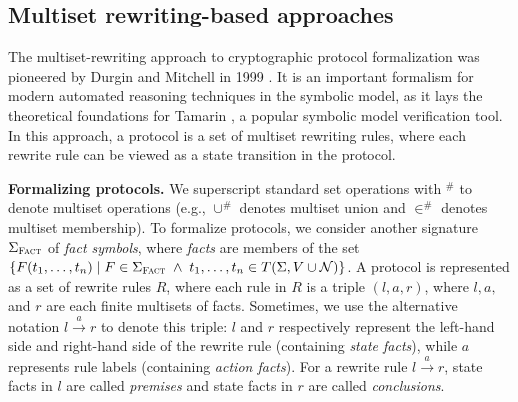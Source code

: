 \documentclass{article}
\theoremstyle{definition}
\begin{document}
\subsection{Multiset rewriting-based approaches}\label{sec:msr-approaches}
The multiset-rewriting approach to cryptographic protocol formalization was pioneered by Durgin and Mitchell in 1999 \cite{msr_foundations}. It is an important formalism for modern automated reasoning techniques in the symbolic model, as it lays the theoretical foundations for Tamarin \cite{tamarin}, a popular symbolic model verification tool.
In this approach, a protocol is a set of multiset rewriting rules, where each rewrite rule can be viewed as a state transition in the protocol. 

\textbf{Formalizing protocols.} We superscript standard set operations with $^\#$ to denote multiset operations (e.g., $\cup^\#$ denotes multiset union and $\in^\#$ denotes multiset membership). To formalize protocols, we consider another signature $\Sigma_{\textsc{Fact}}$ of \textit{fact symbols}, where \textit{facts} are members of the set $\{ F(t_1, \dots, t_n) \mid F \in \Sigma_{\textsc{Fact}} \;\land\; t_1, \dots, t_n \in T(\Sigma, V \cup \mathcal{N}) \}$. A protocol is represented as a set of rewrite rules $R$, where each rule in $R$ is a triple $(l, a, r)$, where $l, a,$ and $r$ are each finite multisets of facts. Sometimes, we use the alternative notation $l \xrightarrow{a} r$ to denote this triple: $l$ and $r$ respectively represent the left-hand side and right-hand side of the rewrite rule (containing \textit{state facts}), while $a$ represents rule labels (containing \textit{action facts}). 
For a rewrite rule $l \xrightarrow{a} r$, 
state facts in $l$ are called \emph{premises} and state facts in $r$ are called \emph{conclusions}.
\end{document}
